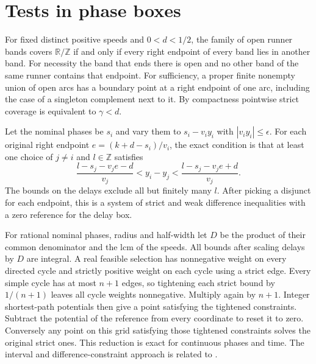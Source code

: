 \documentclass[11pt]{article}
\newcommand{\T}{\mathbb{R}/\mathbb{Z}}
\newcommand{\Z}{\mathbb{Z}}
\begin{document}
\section{Tests in phase boxes}

For fixed distinct positive speeds and \(0<d<1/2\), the family of
open runner bands covers \(\T\) if and only if every right endpoint
of every band lies in another band. For necessity the band that
ends there is open and no other band of the same runner contains
that endpoint. For sufficiency, a proper finite nonempty union
of open arcs has a boundary point at a right endpoint of one arc,
including the case of a singleton complement next to it.
By compactness pointwise strict coverage is equivalent to
\(\gamma<d\).

Let the nominal phases be \(s_i\) and vary them to \(s_i-v_i y_i\)
with \(|v_i y_i|\le\epsilon\). For each original right endpoint
\(e=(k+d-s_i)/v_i\), the exact condition is that at least one choice
of \(j\ne i\) and \(l\in\Z\) satisfies
\[
 \frac{l-s_j-v_j e-d}{v_j}< y_i-y_j <
 \frac{l-s_j-v_j e+d}{v_j}.
\]
The bounds on the delays exclude all but finitely many \(l\).
After picking a disjunct for each endpoint, this is a system
of strict and weak difference inequalities with a zero reference
for the delay box.

For rational nominal phases, radius and half-width let \(D\) be
the product of their common denominator and the lcm of the speeds.
All bounds after scaling delays by \(D\) are integral.
A real feasible selection has nonnegative weight on every
directed cycle and strictly positive weight on each cycle using
a strict edge. Every simple cycle has at most \(n+1\) edges, so
tightening each strict bound by \(1/(n+1)\) leaves all cycle weights
nonnegative. Multiply again by \(n+1\).
Integer shortest-path potentials then give a point satisfying the
tightened constraints. Subtract the potential of the reference
from every coordinate to reset it to zero. Conversely any point on
this grid satisfying those tightened constraints solves the original
strict ones. This reduction is exact for continuous phases and time.
The interval and difference-constraint approach is related to
\cite[Section 5]{BCS}.
\end{document}
